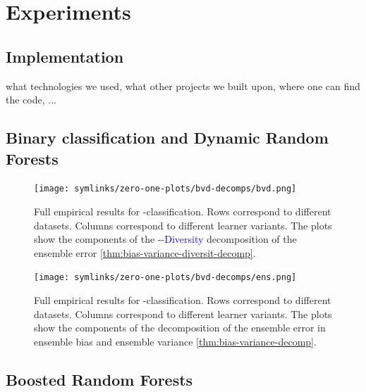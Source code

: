 \documentclass[
    a4paper, %
	fontsize=10pt, %
	twoside=false, %
]{kaobook}
\begin{document}
\chapter{Experiments}

\section{Implementation}

what technologies we used, what other projects we built upon, where one can find the code, ...

\section{Binary classification and Dynamic Random Forests}
\label{sec:drf-full-results}



\begin{figure}[hb]
	\texttt{[image: symlinks/zero-one-plots/bvd-decomps/bvd.png]}
	\caption{
        Full empirical results for \zeroone-classification. Rows correspond to different datasets. Columns correspond to different learner variants. The plots show the components of the 
        \textcolor{orange}{}-\textcolor{green}{}-\textcolor{blue}{Diversity} decomposition of the ensemble error \ref{thm:bias-variance-diversit-decomp}.
    }
    \label{fig:zero-one-bvd-plots}
\end{figure}

\begin{figure}[hb]
	\texttt{[image: symlinks/zero-one-plots/bvd-decomps/ens.png]}
	\caption{
        Full empirical results for \zeroone-classification. Rows correspond to different datasets. Columns correspond to different learner variants. The plots show the components of the 
        decomposition of the ensemble error in ensemble bias and ensemble variance \ref{thm:bias-variance-decomp}.
    }
    \label{fig:zero-one-bvd-plots}
\end{figure}


\section{Boosted Random Forests}
\end{document}
